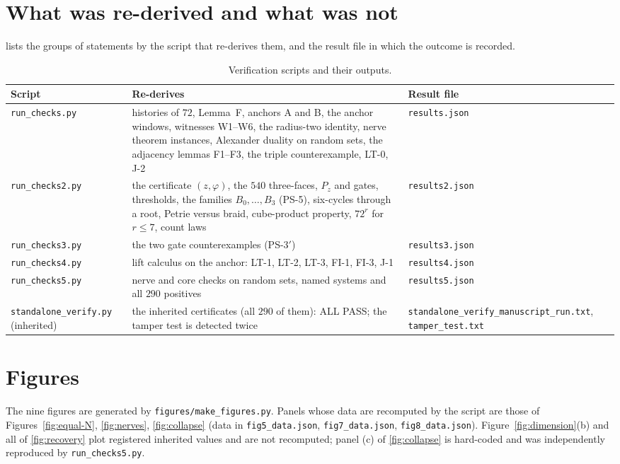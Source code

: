 \section{What was re-derived and what was not}
 lists the groups of statements by the script that re-derives them, and the result file in which the outcome is recorded.
\begin{table}[ht]\centering\footnotesize
\begin{tabular}{@{}p{3.4cm}p{5.2cm}p{3.7cm}@{}}\toprule Script & Re-derives & Result file\\\midrule
\texttt{run\_\allowbreak checks.py} & histories of $72$, Lemma~F, anchors A and B, the anchor windows, witnesses W1--W6, the radius-two identity, nerve theorem instances, Alexander duality on random sets, the adjacency lemmas F1--F3, the triple counterexample, LT-0, J-2 & \texttt{results.json}\\
\texttt{run\_\allowbreak checks2.py} & the certificate $(z,\varphi)$, the $540$ three-faces, $P_z$ and gates, thresholds, the families $B_0,\dots,B_3$ (PS-5), six-cycles through a root, Petrie versus braid, cube-product property, $72^r$ for $r\le7$, count laws & \texttt{results2.json}\\
\texttt{run\_\allowbreak checks3.py} & the two gate counterexamples (PS-3$'$) & \texttt{results3.json}\\
\texttt{run\_\allowbreak checks4.py} & lift calculus on the anchor: LT-1, LT-2, LT-3, FI-1, FI-3, J-1 & \texttt{results4.json}\\
\texttt{run\_\allowbreak checks5.py} & nerve and core checks on random sets, named systems and all $290$ positives & \texttt{results5.json}\\
\texttt{standalone\_\allowbreak verify.py} (inherited) & the inherited certificates (all $290$ of them): ALL PASS; the tamper test is detected twice & \texttt{standalone\_\allowbreak verify\_\allowbreak manuscript\_\allowbreak run.txt}, \texttt{tamper\_\allowbreak test.txt}\\
\bottomrule\end{tabular}
\caption{Verification scripts and their outputs.}\label{tab:methods}
\end{table}

\section{Figures}
The nine figures are generated by \texttt{figures/make\_figures.py}. Panels whose data are recomputed by the script are those of Figures~\ref{fig:equal-N}, \ref{fig:nerves}, \ref{fig:collapse} (data in \texttt{fig5\_data.json}, \texttt{fig7\_data.json}, \texttt{fig8\_data.json}). Figure~\ref{fig:dimension}(b) and all of \cref{fig:recovery} plot registered inherited values and are not recomputed; panel (c) of \cref{fig:collapse} is hard-coded and was independently reproduced by \texttt{run\_checks5.py}.

